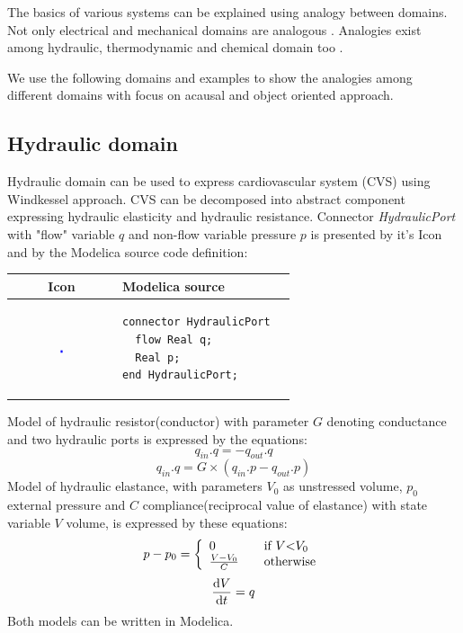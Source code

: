 \documentclass[letterpaper, 10 pt, conference]{ieeeconf}  %
\begin{document}
The basics of various systems can be explained using analogy between domains. Not only electrical and mechanical domains are analogous \cite{firestone1933}. Analogies exist among hydraulic, thermodynamic and chemical domain too \cite{kofranek2013Pacientske}.

We use the following domains and examples to show the analogies among different domains with focus on acausal and object oriented approach. 

\subsection{Hydraulic domain}

Hydraulic domain can be used to express cardiovascular system (CVS) using Windkessel approach\cite{Kulhanek2014mefanet}. CVS can be decomposed into abstract component expressing hydraulic elasticity and hydraulic resistance. Connector \emph{HydraulicPort} with "flow" variable $q$ and non-flow variable pressure $p$ is presented by it's Icon and by the Modelica source code definition:

\begin{tabular}{cl}
Icon & Modelica source \\
\hline
\includegraphics[width=0.03\textwidth]{Connector.png} & \begin{lstlisting}[language=modelica, backgroundcolor=\color{white}] 
connector HydraulicPort  
  flow Real q; 
  Real p; 
end HydraulicPort;  
\end{lstlisting}\\

\end{tabular}

Model of hydraulic resistor(conductor) with parameter $G$ denoting conductance and two hydraulic ports is expressed by the equations:
\begin{equation}
q_{in}.q = -q_{out}.q \label{eq:conductor1}
\end{equation} 
\begin{equation}
 q_{in}.q = G \times (q_{in}.p-q_{out}.p) \label{eq:conductor2}
\end{equation}
Model of hydraulic elastance, with parameters $V_0$ as unstressed volume, $p_0$ external pressure and $C$ compliance(reciprocal value of elastance) with state variable $V$ volume, is expressed by these equations:
\begin{equation} \label{eq:elastic1}p-p_0 = \left\{   
  \begin{array}{l l} 0 & \quad \text{if } V \text{\textless} V_0 \\ 
    \frac{V-V_0}{C} & \quad \text{otherwise}
  \end{array} \right.\end{equation} 
\begin{equation}\label{eq:elastic2}\frac{{\rm d}V}{{\rm d}t} =  q\end{equation} 
Both models can be written in Modelica.
\end{document}
